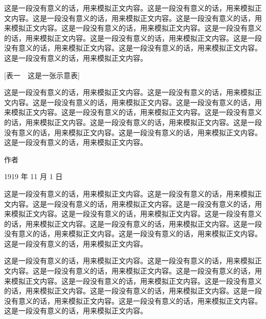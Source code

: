 这是一段没有意义的话，用来模拟正文内容。这是一段没有意义的话，用来模拟正文内容。这是一段没有意义的话，用来模拟正文内容。这是一段没有意义的话，用来模拟正文内容。这是一段没有意义的话，用来模拟正文内容。这是一段没有意义的话，用来模拟正文内容。这是一段没有意义的话，用来模拟正文内容。这是一段没有意义的话，用来模拟正文内容。这是一段没有意义的话，用来模拟正文内容。这是一段没有意义的话，用来模拟正文内容。

[表一　这是一张示意表]

这是一段没有意义的话，用来模拟正文内容。这是一段没有意义的话，用来模拟正文内容。这是一段没有意义的话，用来模拟正文内容。这是一段没有意义的话，用来模拟正文内容。这是一段没有意义的话，用来模拟正文内容。这是一段没有意义的话，用来模拟正文内容。这是一段没有意义的话，用来模拟正文内容。这是一段没有意义的话，用来模拟正文内容。这是一段没有意义的话，用来模拟正文内容。这是一段没有意义的话，用来模拟正文内容。

\closing{作者}{1919 年 11 月 1 日}



这是一段没有意义的话，用来模拟正文内容。这是一段没有意义的话，用来模拟正文内容。这是一段没有意义的话，用来模拟正文内容。这是一段没有意义的话，用来模拟正文内容。这是一段没有意义的话，用来模拟正文内容。这是一段没有意义的话，用来模拟正文内容。这是一段没有意义的话，用来模拟正文内容。这是一段没有意义的话，用来模拟正文内容。这是一段没有意义的话，用来模拟正文内容。这是一段没有意义的话，用来模拟正文内容。

这是一段没有意义的话，用来模拟正文内容。这是一段没有意义的话，用来模拟正文内容。这是一段没有意义的话，用来模拟正文内容。这是一段没有意义的话，用来模拟正文内容。这是一段没有意义的话，用来模拟正文内容。这是一段没有意义的话，用来模拟正文内容。这是一段没有意义的话，用来模拟正文内容。这是一段没有意义的话，用来模拟正文内容。这是一段没有意义的话，用来模拟正文内容。这是一段没有意义的话，用来模拟正文内容。

